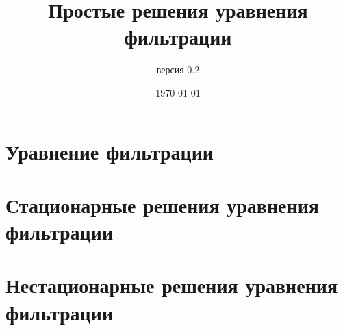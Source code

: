 \documentclass[oneside, openany]{memoir}
\author{версия 0.2}
\title{Простые решения уравнения фильтрации}
\date{\today}
\begin{document}
	
	\maketitle
	
	\chapter{Уравнение фильтрации}
	
	
	
	
	
	\chapter{Стационарные решения уравнения фильтрации}
	
	
	
	
	
	\chapter{Нестационарные решения уравнения фильтрации}
	
	
	

	
	
	
	\printbibliography
	
	
	
\end{document}
